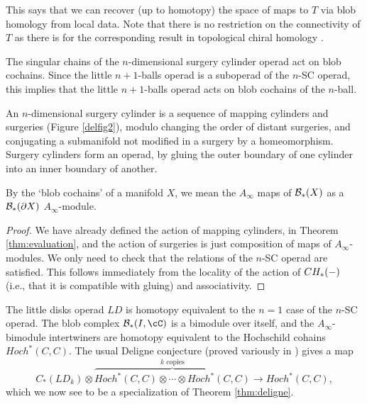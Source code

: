 \documentclass{pnastwo}
\begin{document}
\begin{article}
This says that we can recover (up to homotopy) the space of maps to $T$ via blob homology from local data. 
Note that there is no restriction on the connectivity of $T$ as there is for the corresponding result in topological chiral homology \cite[Theorem 3.8.6]{0911.0018}.

\begin{thm}
\label{thm:deligne}
The singular chains of the $n$-dimensional surgery cylinder operad act on blob cochains.
Since the little $n{+}1$-balls operad is a suboperad of the $n$-SC operad,
this implies that the little $n{+}1$-balls operad acts on blob cochains of the $n$-ball.
\end{thm}

An $n$-dimensional surgery cylinder is a sequence of mapping cylinders and surgeries (Figure \ref{delfig2}), modulo changing the order of distant surgeries, and conjugating a submanifold not modified in a surgery by a homeomorphism. Surgery cylinders form an operad, by gluing the outer boundary of one cylinder into an inner boundary of another.

By the `blob cochains' of a manifold $X$, we mean the $A_\infty$ maps of ${\mathcal B}_*(X)$ as a ${\mathcal B}_*(\partial X)$ $A_\infty$-module.

\begin{proof}
We have already defined the action of mapping cylinders, in Theorem \ref{thm:evaluation}, and the action of surgeries is just composition of maps of $A_\infty$-modules. We only need to check that the relations of the $n$-SC operad are satisfied. This follows immediately from the locality of the action of $CH_*(-)$ (i.e., that it is compatible with gluing) and associativity.
\end{proof} 

The little disks operad $LD$ is homotopy equivalent to the $n=1$ case of the $n$-SC operad. The blob complex $\bc_*(I, \cC)$ is a bimodule over itself, and the $A_\infty$-bimodule intertwiners are homotopy equivalent to the Hochschild cohains $Hoch^*(C, C)$. The usual Deligne conjecture (proved variously in \cite{hep-th/9403055, MR1805894, MR2064592, MR1805923}) gives a map
\[
	C_*(LD_k)\otimes \overbrace{Hoch^*(C, C)\otimes\cdots\otimes Hoch^*(C, C)}^{\text{$k$ copies}}
			\to  Hoch^*(C, C),
\]
which we now see to be a specialization of Theorem \ref{thm:deligne}.





\end{article}
\end{document}
